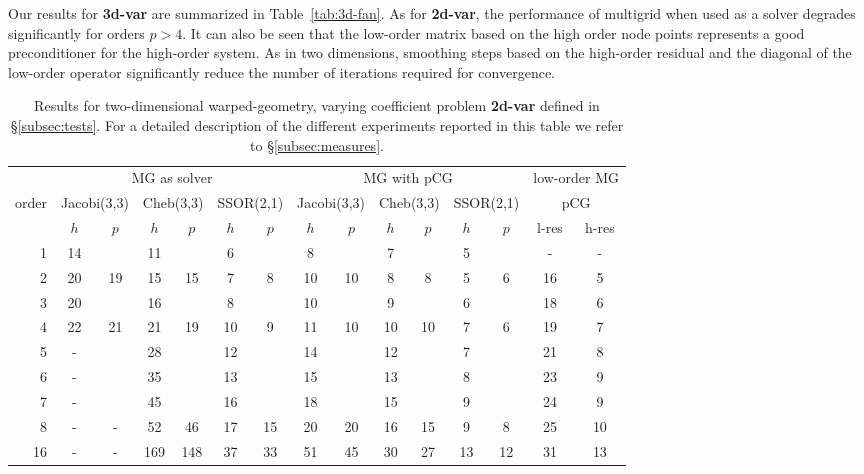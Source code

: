 \documentclass[smallcondensed,final]{svjour3}     %
\begin{document}
Our results for {\bf 3d-var} are
summarized in Table~\ref{tab:3d-fan}. As for {\bf 2d-var}, the
performance of multigrid when used as a solver degrades significantly
for orders $p>4$. It can also be seen that the low-order matrix based on
the high order node points represents a good preconditioner for the
high-order system. As in two dimensions, smoothing steps based on the
high-order residual and the diagonal of the low-order operator
significantly reduce the number of iterations required for
convergence.


\begin{table}
  \caption{\label{tab:2d-fan} Results for two-dimensional
    warped-geometry, varying coefficient problem {\bf 2d-var} defined
    in \S\ref{subsec:tests}.
    For a
    detailed description of the different experiments reported in this
    table we refer to \S\ref{subsec:measures}.}  \centering
  \begin{tabular}{|r|c c|c c|c c||c c|c c|c c||c c|} 
    \hline
    & \multicolumn{6}{c||}{MG as solver} & \multicolumn{6}{c||}{MG
      with pCG} & \multicolumn{2}{r|}{\!\!low-order MG\!\!} \\
    \cline{2-13}
    \!\!\! order \!\!\!\! &  \multicolumn{2}{c|}{\!\!\scriptsize  Jacobi(3,3)\!\!} &  \multicolumn{2}{c|}{\!\!\scriptsize Cheb(3,3)\!\!} & \multicolumn{2}{c||}{\!\!\scriptsize  SSOR(2,1)\!\!} & \multicolumn{2}{c|}{\!\!\scriptsize Jacobi(3,3)\!\!} &  \multicolumn{2}{c|}{\!\!\scriptsize Cheb(3,3)\!\!} & \multicolumn{2}{c||}{\!\!\scriptsize SSOR(2,1)\!\!} & \multicolumn{2}{c|}{pCG}\\
\hline
 & $h$ & $p$ & $h$ & $p$& $h$ & $p$& $h$ & $p$& $h$ & $p$& $h$ & $p$& l-res & h-res\\
 \cline{2-15}
1 & 14 & & 11 & & 6 & & 8 & & 7 & & 5 & & -  & - \\
2 & 20 & 19 & 15 & 15 & 7 & 8 & 10 & 10 & 8 & 8 & 5 & 6 & 16  & 5 \\
3 & 20 & & 16 & & 8 & & 10 & & 9 & & 6 & & 18 & 6 \\
4 & 22 & 21 & 21 & 19 & 10 & 9 & 11 & 10 & 10 & 10 & 7 & 6 & 19 & 7\\
5 & -  & & 28 & & 12 & & 14 & & 12 & & 7 & & 21 & 8  \\
6 & -  & & 35 & & 13 & & 15 & & 13 & & 8 & & 23 &  9 \\
7 & -  & & 45 & & 16 & & 18 & & 15 & & 9 & & 24 &  9 \\
8 & -  & - & 52 & 46 & 17 & 15 & 20 & 20 & 16 & 15 & 9 & 8 & 25 & 10 \\
16 & - & - & 169 & 148 & 37 & 33 & 51 & 45 & 30 & 27 & 13 & 12 & 31 & 13 \\
\hline
  \end{tabular}
\end{table}
\end{document}
